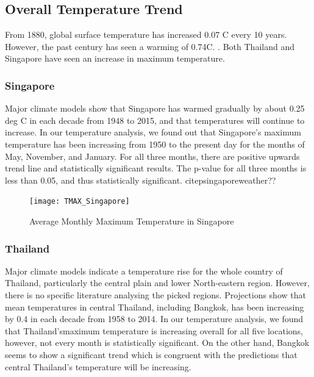 \subsection{Overall Temperature Trend}
From 1880, global surface temperature has increased 0.07 \degree C every 10 years. However, the past century has seen a warming of 0.74\degree C. \citep{tempincrease}. Both Thailand and Singapore have seen an increase in maximum temperature.

\subsubsection{Singapore}

Major climate models show that Singapore has warmed gradually by about 0.25 deg C in each decade from 1948 to 2015, and that temperatures will continue to increase. In our temperature analysis, we found out that Singapore's maximum temperature has been increasing from 1950 to the present day for the months of May, November, and January. For all three months, there are positive upwards trend line and statistically significant results. The p-value for all three months is less than 0.05, and thus statistically significant. citep{singaporeweather}??

\citet{loo2015effect}

\begin{figure}[h!]
\centering
  \texttt{[image: TMAX\_Singapore]}
  \caption{Average Monthly Maximum Temperature in Singapore}
  \label{fig:TMAX_Singapore}
\end{figure}

\subsubsection{Thailand}

Major climate models indicate a temperature rise for the whole country of Thailand, particularly the central plain and lower North-eastern region. However, there is no specific literature analysing the picked regions. Projections show that mean temperatures in central Thailand, including Bangkok, has been increasing by 0.4 in each decade from 1958 to 2014. In our temperature analysis, we found that Thailand'smaximum temperature is increasing overall for all five locations, however, not every month is statistically significant. On the other hand, Bangkok seems to show a significant trend which is congruent with the predictions that central Thailand's temperature will be increasing.  \citep{bkkweather}

